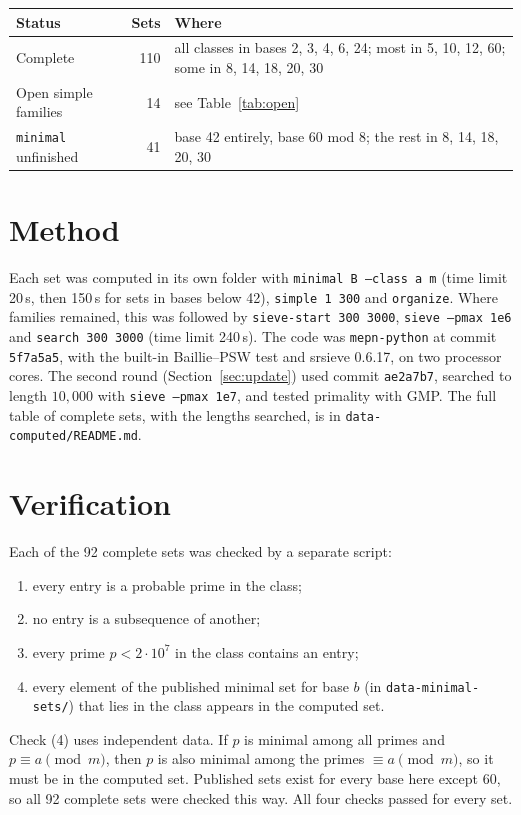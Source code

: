 \documentclass[11pt]{article}
\newcommand{\code}[1]{\texttt{#1}}
\begin{document}
\begin{center}
\begin{tabular}{@{}lrp{8.2cm}@{}}
\toprule
Status & Sets & Where\\
\midrule
Complete & 110 & all classes in bases 2, 3, 4, 6, 24; most in 5, 10, 12, 60; some in 8, 14, 18, 20, 30\\
Open simple families & 14 & see Table~\ref{tab:open}\\
\code{minimal} unfinished & 41 & base 42 entirely, base 60 mod 8; the rest in 8, 14, 18, 20, 30\\
\bottomrule
\end{tabular}
\end{center}

\section{Method}

Each set was computed in its own folder with \code{minimal B --class a m} (time limit 20\,s, then 150\,s for sets in bases below 42), \code{simple 1 300} and \code{organize}. Where families remained, this was followed by \code{sieve-start 300 3000}, \code{sieve --pmax 1e6} and \code{search 300 3000} (time limit 240\,s). The code was \code{mepn-python} at commit \code{5f7a5a5}, with the built-in Baillie--PSW test and srsieve 0.6.17, on two processor cores. The second round (Section~\ref{sec:update}) used commit \code{ae2a7b7}, searched to length $10{,}000$ with \code{sieve --pmax 1e7}, and tested primality with GMP. The full table of complete sets, with the lengths searched, is in \code{data-computed/README.md}.

\section{Verification}

Each of the 92 complete sets was checked by a separate script:
\begin{enumerate}[label=(\arabic*)]
\item every entry is a probable prime in the class;
\item no entry is a subsequence of another;
\item every prime $p<2\cdot10^7$ in the class contains an entry;
\item every element of the published minimal set for base $b$ (in \code{data-minimal-sets/}) that lies in the class appears in the computed set.
\end{enumerate}
Check (4) uses independent data. If $p$ is minimal among all primes and $p\equiv a\pmod m$, then $p$ is also minimal among the primes $\equiv a \pmod m$, so it must be in the computed set. Published sets exist for every base here except 60, so all 92 complete sets were checked this way. All four checks passed for every set.
\end{document}
